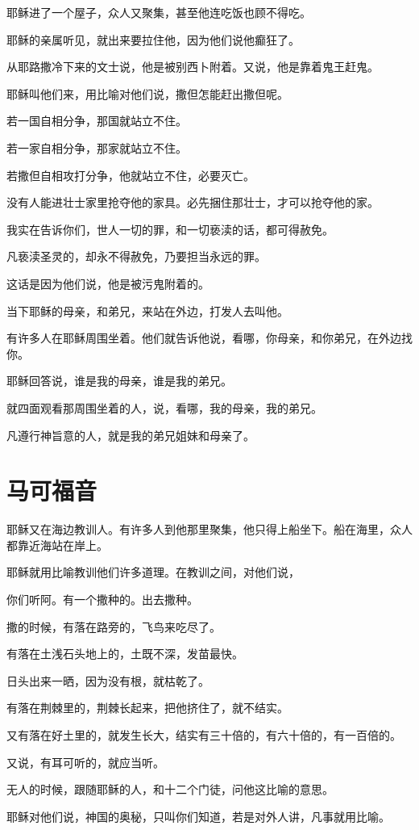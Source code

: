 \documentclass[12pt,oneside]{book}
\begin{document}
耶稣进了一个屋子，众人又聚集，甚至他连吃饭也顾不得吃。

耶稣的亲属听见，就出来要拉住他，因为他们说他癫狂了。

从耶路撒冷下来的文士说，他是被别西卜附着。又说，他是靠着鬼王赶鬼。

耶稣叫他们来，用比喻对他们说，撒但怎能赶出撒但呢。

若一国自相分争，那国就站立不住。

若一家自相分争，那家就站立不住。

若撒但自相攻打分争，他就站立不住，必要灭亡。

没有人能进壮士家里抢夺他的家具。必先捆住那壮士，才可以抢夺他的家。

我实在告诉你们，世人一切的罪，和一切亵渎的话，都可得赦免。

凡亵渎圣灵的，却永不得赦免，乃要担当永远的罪。

这话是因为他们说，他是被污鬼附着的。

当下耶稣的母亲，和弟兄，来站在外边，打发人去叫他。

有许多人在耶稣周围坐着。他们就告诉他说，看哪，你母亲，和你弟兄，在外边找你。

耶稣回答说，谁是我的母亲，谁是我的弟兄。

就四面观看那周围坐着的人，说，看哪，我的母亲，我的弟兄。

凡遵行神旨意的人，就是我的弟兄姐妹和母亲了。

\chapter{马可福音}
耶稣又在海边教训人。有许多人到他那里聚集，他只得上船坐下。船在海里，众人都靠近海站在岸上。

耶稣就用比喻教训他们许多道理。在教训之间，对他们说，

你们听阿。有一个撒种的。出去撒种。

撒的时候，有落在路旁的，飞鸟来吃尽了。

有落在土浅石头地上的，土既不深，发苗最快。

日头出来一晒，因为没有根，就枯乾了。

有落在荆棘里的，荆棘长起来，把他挤住了，就不结实。

又有落在好土里的，就发生长大，结实有三十倍的，有六十倍的，有一百倍的。

又说，有耳可听的，就应当听。

无人的时候，跟随耶稣的人，和十二个门徒，问他这比喻的意思。

耶稣对他们说，神国的奥秘，只叫你们知道，若是对外人讲，凡事就用比喻。
\end{document}
